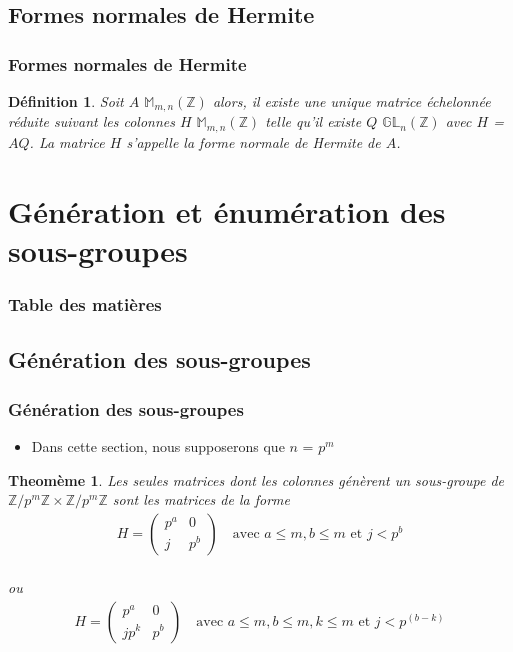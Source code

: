 \documentclass{beamer}
\newtheorem{thm}{Theomème}
\newtheorem{df}{Définition}
\begin{document}
\subsection{Formes normales de Hermite}
\begin{frame}
\frametitle{Formes normales de Hermite}
\begin{df}
    Soit $A$ \in $\mathbb{M}_{m,n}(\mathbb{Z})$ alors, il existe une unique matrice échelonnée réduite suivant les colonnes $H$ \in $\mathbb{M}_{m,n}(\mathbb{Z})$ telle qu'il existe $Q$ \in  $\mathbb{GL}_{n}(\mathbb{Z})$ avec $H$ = $AQ$. La matrice $H$ s'appelle la forme normale de Hermite de $A$.
\end{df}
\end{frame}


\section{Génération et énumération des sous-groupes}
\begin{frame}
\frametitle{Table des matières}
\tableofcontents[currentsection]
\end{frame}


\subsection{Génération des sous-groupes}
\begin{frame}
\frametitle{Génération des sous-groupes}
\begin{itemize}
    \item Dans cette section, nous supposerons que $n$ = ${p}^{m}$
\end{itemize}
\begin{thm}
    Les seules matrices dont les colonnes génèrent un sous-groupe de $\mathbb{Z}/p^m\mathbb{Z} \times \mathbb{Z}/p^m\mathbb{Z}$ sont les matrices de la forme
    \begin{align*}
        H = \begin{pmatrix}
        p^a & 0 \\
        j & p^b 
        \end{pmatrix}
        \quad \text{avec } a \leq m, b \leq m \text{ et } j < p^b    
    \end{align*}\\
    \center ou
    \begin{align*}
        H = \begin{pmatrix}
        p^a & 0 \\
        jp^k & p^b 
        \end{pmatrix}
        \quad \text{avec } a \leq m, b \leq m, k \leq m \text{ et } j < p^(b-k)
    \end{align*}
\end{thm}
\end{frame}
\end{document}
